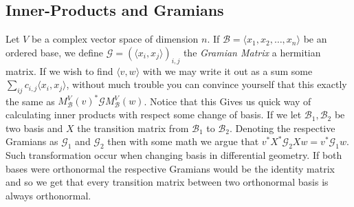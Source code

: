 \documentclass[12pt]{article}
\theoremstyle{definition}
\theoremstyle{remark}
\theoremstyle{plain}
\begin{document}
\subsection{Inner-Products and Gramians}
    Let $V$ be a complex vector space of dimension $n$. If $\mathcal{B}=\langle x_1,x_2,\ldots,x_n\rangle$ be an ordered base, we define $\mathscr{G}=(\langle x_i,x_j \rangle)_{i,j}$ the \textit{Gramian Matrix} a hermitian matrix. If we wish to find $\langle v,w\rangle$ with we may write it out as a sum some $\sum \limits_{ij}c_{i,j}\langle x_i,x_j \rangle$, without much trouble you can convince yourself that this exactly the same as $M_\mathcal{B}^V(v)^* \mathscr{G}M_\mathcal{B}^V(w)$.
Notice that this Gives us quick way of calculating inner products with respect some change of basis.
If we let $\mathcal{B}_1,\mathcal{B}_2$ be two basis and $X$ the transition matrix from $\mathcal{B}_1$ to $\mathcal{B}_2$.
Denoting the respective Gramians as $\mathscr{G}_1$ and $\mathscr{G}_2$ then with some math we argue that $v^* X^*\mathscr{G}_2Xw=v^*\mathscr{G}_1w$.
Such transformation occur when changing basis in differential geometry.
If both bases were orthonormal the respective Gramians would be the identity matrix and so we get that every transition matrix between two orthonormal basis is always orthonormal.
\end{document}
